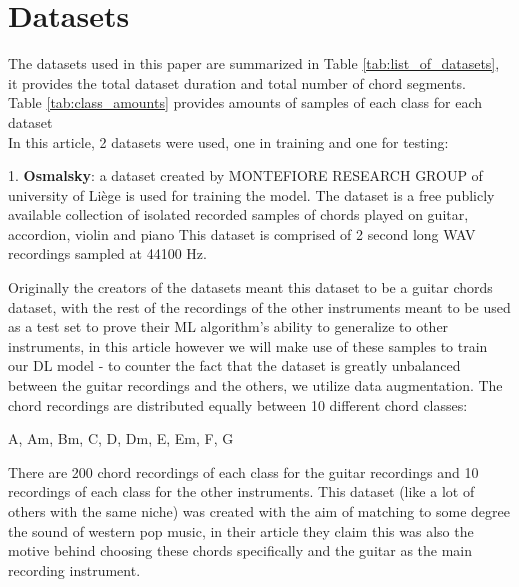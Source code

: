 \documentclass[a4paper]{article}
\begin{document}
\section{Datasets} \label{sec:dataset}
The datasets used in this paper are summarized in Table \ref{tab:list_of_datasets}, it provides the total dataset duration and total number of chord segments.
\\
Table \ref{tab:class_amounts} provides amounts of samples of each class for each dataset
\\

\noindent In this article, 2 datasets were used, one in training and one for testing:

1. \textbf{Osmalsky}: a dataset created by MONTEFIORE RESEARCH GROUP of university of Liège \cite{dataset, dataset_ood, baseline} is used for training the model. The dataset is a free publicly available collection of isolated recorded samples of chords played on guitar, accordion, violin and piano
This dataset is comprised of 2 second long WAV recordings sampled at 44100 Hz.

Originally the creators of the datasets meant this dataset to be a guitar chords dataset, with the rest of the recordings of the other instruments meant to be used as a test set to prove their ML algorithm's ability to generalize to other instruments, in this article however we will make use of these samples to train our DL model - to counter the fact that the dataset is greatly unbalanced between the guitar recordings and the others, we utilize data augmentation.
The chord recordings are distributed equally between 10 different chord classes:
\begin{center}
    A, Am, Bm, C, D, Dm, E, Em, F, G
\end{center}

There are 200 chord recordings of each class for the guitar recordings and 10 recordings of each class for the other instruments.
This dataset (like a lot of others with the same niche) was created with the aim of matching to some degree the sound of western pop music, in their article they claim this was also the motive behind choosing these chords specifically and the guitar as the main recording instrument.
\end{document}
